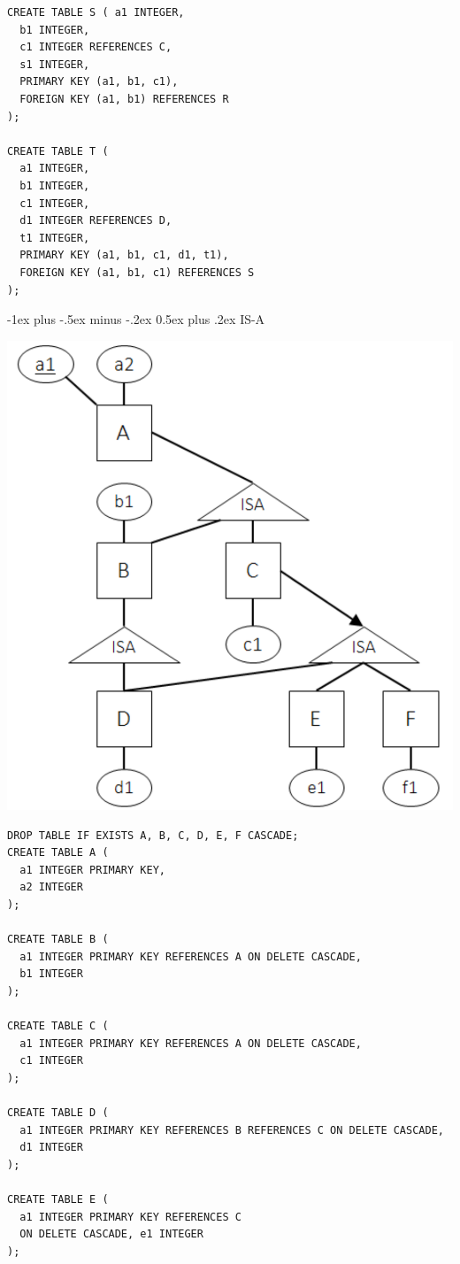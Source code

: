 \documentclass[10pt, landscape]{article}
\makeatletter
\renewcommand{\section}{\@startsection{section}{1}{0mm}%
  {-1ex plus -.5ex minus -.2ex}%
  {0.5ex plus .2ex}%
{\normalfont\large\bfseries}}
\makeatother
\begin{document}
\begin{multicols*}{3}
\begin{lstlisting}[style=mySQL]
CREATE TABLE S ( a1 INTEGER,
  b1 INTEGER,
  c1 INTEGER REFERENCES C,
  s1 INTEGER,
  PRIMARY KEY (a1, b1, c1),
  FOREIGN KEY (a1, b1) REFERENCES R
);

CREATE TABLE T (
  a1 INTEGER,
  b1 INTEGER,
  c1 INTEGER,
  d1 INTEGER REFERENCES D,
  t1 INTEGER,
  PRIMARY KEY (a1, b1, c1, d1, t1), 
  FOREIGN KEY (a1, b1, c1) REFERENCES S
);
  \end{lstlisting}

  \section{IS-A}
  \begin{tightcenter}
    \includegraphics[width=0.8\linewidth]{cs2102-er-model-isa.png} 
  \end{tightcenter}
  \begin{lstlisting}[style=mySQL]
DROP TABLE IF EXISTS A, B, C, D, E, F CASCADE;
CREATE TABLE A (
  a1 INTEGER PRIMARY KEY,
  a2 INTEGER
);

CREATE TABLE B (
  a1 INTEGER PRIMARY KEY REFERENCES A ON DELETE CASCADE,
  b1 INTEGER 
);

CREATE TABLE C (
  a1 INTEGER PRIMARY KEY REFERENCES A ON DELETE CASCADE, 
  c1 INTEGER
);

CREATE TABLE D (
  a1 INTEGER PRIMARY KEY REFERENCES B REFERENCES C ON DELETE CASCADE,
  d1 INTEGER 
);

CREATE TABLE E (
  a1 INTEGER PRIMARY KEY REFERENCES C
  ON DELETE CASCADE, e1 INTEGER
);


\end{lstlisting}
\end{multicols*}
\end{document}
